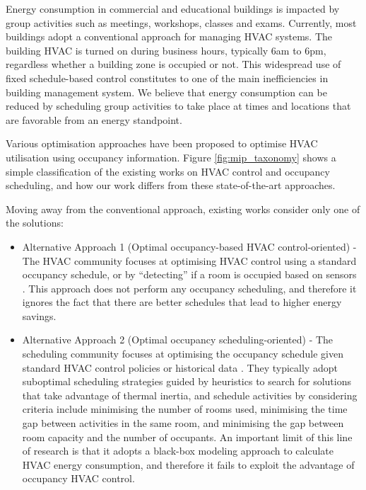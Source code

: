 Energy consumption in commercial and educational buildings is impacted by group activities such as meetings, workshops, classes and exams.
Currently, most buildings adopt a conventional approach for managing HVAC systems. The building HVAC is turned on during business hours, typically 6am to 6pm, regardless whether a building zone is occupied or not. This widespread use of fixed schedule-based control constitutes to one of the main inefficiencies in building management system. We believe that energy consumption can be reduced by scheduling group activities to take place at times and locations that are favorable from an energy standpoint.

Various optimisation approaches have been proposed to optimise HVAC utilisation using occupancy information. Figure \ref{fig:mip_taxonomy} shows a simple classification of the existing works on HVAC control and occupancy scheduling, and how our work differs from these state-of-the-art approaches. 

Moving away from the conventional approach, existing works consider only one of the solutions: 
\begin{itemize}
	\item Alternative Approach 1 (Optimal occupancy-based HVAC control-oriented) - The HVAC community focuses at optimising HVAC control using a standard occupancy schedule, or by ``detecting'' if a room is occupied based on sensors \citep{agarwal2010occupancy,goyal2013occupancy,brooks2015energy}. This approach does not perform any occupancy scheduling, and therefore it ignores the fact that there are better schedules that lead to higher energy savings.
	\item Alternative Approach 2 (Optimal occupancy scheduling-oriented) - The scheduling community focuses at optimising the occupancy schedule given standard HVAC control policies or historical data \citep{pan2012thermal,majumdar2012energy,kwak2013tesla,majumdar2016characterising}. They typically adopt suboptimal scheduling strategies guided by heuristics to search for solutions that take advantage of thermal inertia, and schedule activities by considering criteria include minimising the number of rooms used, minimising the time gap between activities in the same room, and minimising the gap between room capacity and the number of occupants.	An important limit of this line of research is that it adopts a black-box modeling approach to calculate HVAC energy consumption, and therefore it fails to exploit the advantage of occupancy HVAC control.
\end{itemize}



